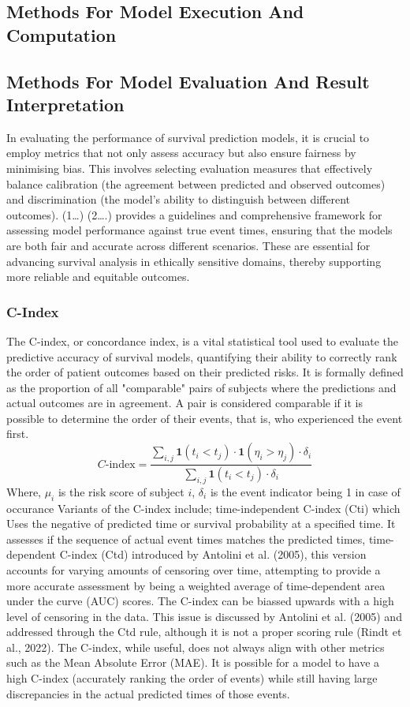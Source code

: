 \subsection{Methods For Model Execution And Computation}

\subsection{Methods For Model Evaluation And Result Interpretation}
In evaluating the performance of survival prediction models, it is crucial to employ metrics that not only assess accuracy but also ensure fairness by minimising bias. This involves selecting evaluation measures that effectively balance calibration (the agreement between predicted and observed outcomes) and discrimination (the model's ability to distinguish between different outcomes). (1…) (2….) provides a guidelines and comprehensive framework for assessing model performance against true event times, ensuring that the models are both fair and accurate across different scenarios. These are essential for advancing survival analysis in ethically sensitive domains, thereby supporting more reliable and equitable outcomes.

\subsubsection{C-Index}
\noindent The C-index, or concordance index, is a vital statistical tool used to evaluate the predictive accuracy of survival models, quantifying their ability to correctly rank the order of patient outcomes based on their predicted risks. It is formally defined as the proportion of all "comparable" pairs of subjects where the predictions and actual outcomes are in agreement. A pair is considered comparable if it is possible to determine the order of their events, that is, who experienced the event first.
\[C\text{-index} = \frac{\sum_{i,j} \mathbf{1}(t_i < t_j) \cdot \mathbf{1}(\eta_i > \eta_j) \cdot \delta_i}{\sum_{i,j} \mathbf{1}(t_i < t_j) \cdot \delta_i}\]
\noindent Where, \(\mu_{i}\) is the risk score of subject \(i\), \(\delta_{i}\) is the event indicator being 1 in case of occurance
\noindent Variants of the C-index include; time-independent C-index (Cti) which Uses the negative of predicted time or survival probability at a specified time. It assesses if the sequence of actual event times matches the predicted times, time-dependent C-index (Ctd) introduced by Antolini et al. (2005), this version accounts for varying amounts of censoring over time, attempting to provide a more accurate assessment by being a weighted average of time-dependent area under the curve (AUC) scores. The C-index can be biassed upwards with a high level of censoring in the data. This issue is discussed by Antolini et al. (2005) and addressed through the Ctd rule, although it is not a proper scoring rule (Rindt et al., 2022). The C-index, while useful, does not always align with other metrics such as the Mean Absolute Error (MAE). It is possible for a model to have a high C-index (accurately ranking the order of events) while still having large discrepancies in the actual predicted times of those events.

